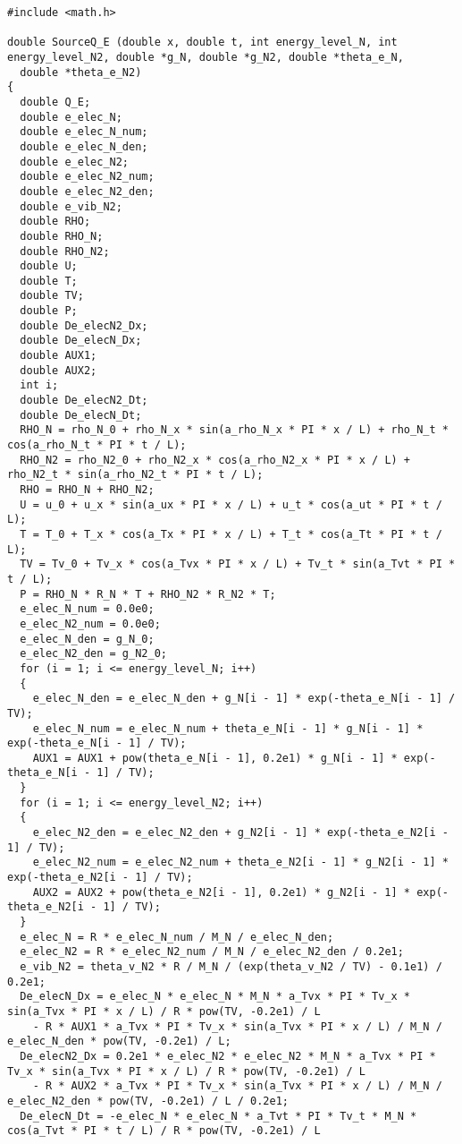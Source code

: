 \documentclass[10pt]{article}
\begin{document}
\begin{scriptsize}
\begin{verbatim}
#include <math.h>

double SourceQ_E (double x, double t, int energy_level_N, int energy_level_N2, double *g_N, double *g_N2, double *theta_e_N, 
  double *theta_e_N2)
{
  double Q_E;
  double e_elec_N;
  double e_elec_N_num;
  double e_elec_N_den;
  double e_elec_N2;
  double e_elec_N2_num;
  double e_elec_N2_den;
  double e_vib_N2;
  double RHO;
  double RHO_N;
  double RHO_N2;
  double U;
  double T;
  double TV;
  double P;
  double De_elecN2_Dx;
  double De_elecN_Dx;
  double AUX1;
  double AUX2;
  int i;
  double De_elecN2_Dt;
  double De_elecN_Dt;
  RHO_N = rho_N_0 + rho_N_x * sin(a_rho_N_x * PI * x / L) + rho_N_t * cos(a_rho_N_t * PI * t / L);
  RHO_N2 = rho_N2_0 + rho_N2_x * cos(a_rho_N2_x * PI * x / L) + rho_N2_t * sin(a_rho_N2_t * PI * t / L);
  RHO = RHO_N + RHO_N2;
  U = u_0 + u_x * sin(a_ux * PI * x / L) + u_t * cos(a_ut * PI * t / L);
  T = T_0 + T_x * cos(a_Tx * PI * x / L) + T_t * cos(a_Tt * PI * t / L);
  TV = Tv_0 + Tv_x * cos(a_Tvx * PI * x / L) + Tv_t * sin(a_Tvt * PI * t / L);
  P = RHO_N * R_N * T + RHO_N2 * R_N2 * T;
  e_elec_N_num = 0.0e0;
  e_elec_N2_num = 0.0e0;
  e_elec_N_den = g_N_0;
  e_elec_N2_den = g_N2_0;
  for (i = 1; i <= energy_level_N; i++)
  {
    e_elec_N_den = e_elec_N_den + g_N[i - 1] * exp(-theta_e_N[i - 1] / TV);
    e_elec_N_num = e_elec_N_num + theta_e_N[i - 1] * g_N[i - 1] * exp(-theta_e_N[i - 1] / TV);
    AUX1 = AUX1 + pow(theta_e_N[i - 1], 0.2e1) * g_N[i - 1] * exp(-theta_e_N[i - 1] / TV);
  }
  for (i = 1; i <= energy_level_N2; i++)
  {
    e_elec_N2_den = e_elec_N2_den + g_N2[i - 1] * exp(-theta_e_N2[i - 1] / TV);
    e_elec_N2_num = e_elec_N2_num + theta_e_N2[i - 1] * g_N2[i - 1] * exp(-theta_e_N2[i - 1] / TV);
    AUX2 = AUX2 + pow(theta_e_N2[i - 1], 0.2e1) * g_N2[i - 1] * exp(-theta_e_N2[i - 1] / TV);
  }
  e_elec_N = R * e_elec_N_num / M_N / e_elec_N_den;
  e_elec_N2 = R * e_elec_N2_num / M_N / e_elec_N2_den / 0.2e1;
  e_vib_N2 = theta_v_N2 * R / M_N / (exp(theta_v_N2 / TV) - 0.1e1) / 0.2e1;
  De_elecN_Dx = e_elec_N * e_elec_N * M_N * a_Tvx * PI * Tv_x * sin(a_Tvx * PI * x / L) / R * pow(TV, -0.2e1) / L 
    - R * AUX1 * a_Tvx * PI * Tv_x * sin(a_Tvx * PI * x / L) / M_N / e_elec_N_den * pow(TV, -0.2e1) / L;
  De_elecN2_Dx = 0.2e1 * e_elec_N2 * e_elec_N2 * M_N * a_Tvx * PI * Tv_x * sin(a_Tvx * PI * x / L) / R * pow(TV, -0.2e1) / L 
    - R * AUX2 * a_Tvx * PI * Tv_x * sin(a_Tvx * PI * x / L) / M_N / e_elec_N2_den * pow(TV, -0.2e1) / L / 0.2e1;
  De_elecN_Dt = -e_elec_N * e_elec_N * a_Tvt * PI * Tv_t * M_N * cos(a_Tvt * PI * t / L) / R * pow(TV, -0.2e1) / L 

\end{verbatim}
\end{scriptsize}
\end{document}
